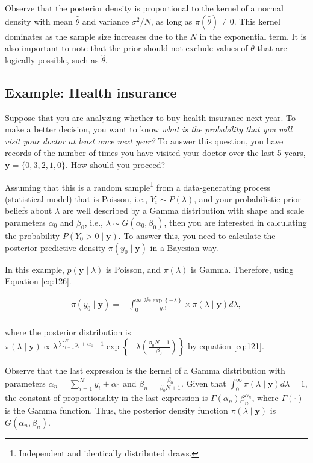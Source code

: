 Observe that the posterior density is proportional to the kernel of a normal density with mean $\hat{\theta}$ and variance $\sigma^2 / N$, as long as $\pi(\hat{\theta}) \neq 0$. This kernel dominates as the sample size increases due to the $N$ in the exponential term. It is also important to note that the prior should not exclude values of $\theta$ that are logically possible, such as $\hat{\theta}$.

\subsection{Example: Health insurance}\label{sec121}
Suppose that you are analyzing whether to buy health insurance next year. To make a better decision, you want to know \textit{what is the probability that you will visit your doctor at least once next year?} To answer this question, you have records of the number of times you have visited your doctor over the last 5 years, \( \mathbf{y} = \{0, 3, 2, 1, 0\} \). How should you proceed?

Assuming that this is a random sample\footnote{Independent and identically distributed draws.} from a data-generating process (statistical model) that is Poisson, i.e., \( Y_i \sim P(\lambda) \), and your probabilistic prior beliefs about \( \lambda \) are well described by a Gamma distribution with shape and scale parameters \( \alpha_0 \) and \( \beta_0 \), i.e., \( \lambda \sim G(\alpha_0, \beta_0) \), then you are interested in calculating the probability \( P(Y_0 > 0 \mid \mathbf{y}) \). To answer this, you need to calculate the posterior predictive density \( \pi(y_0 \mid \mathbf{y}) \) in a Bayesian way.

In this example, \( p(\mathbf{y} \mid \lambda) \) is Poisson, and \( \pi(\lambda) \) is Gamma. Therefore, using Equation \ref{eq:126}.


\begin{align*}
	\pi(y_0\mid \mathbf{y})=&\int_{0}^{\infty}\frac{\lambda^{y_0}\exp\left\{-\lambda\right\}}{y_0!}\times \pi(\lambda\mid \mathbf{y})d\lambda,\\
\end{align*}

where the posterior distribution is $\pi(\lambda\mid \mathbf{y})\propto \lambda^{\sum_{i=1}^N y_i + \alpha_0 - 1}\exp\left\{-\lambda\left(\frac{\beta_0 N+1}{\beta_0}\right)\right\}$ by equation \ref{eq:121}.

Observe that the last expression is the kernel of a Gamma distribution with parameters \( \alpha_n = \sum_{i=1}^N y_i + \alpha_0 \) and \( \beta_n = \frac{\beta_0}{\beta_0 N + 1} \). Given that \( \int_0^{\infty} \pi(\lambda \mid \mathbf{y}) d\lambda = 1 \), the constant of proportionality in the last expression is \( \Gamma(\alpha_n) \beta_n^{\alpha_n} \), where \( \Gamma(\cdot) \) is the Gamma function. Thus, the posterior density function \( \pi(\lambda \mid \mathbf{y}) \) is \( G(\alpha_n, \beta_n) \).

